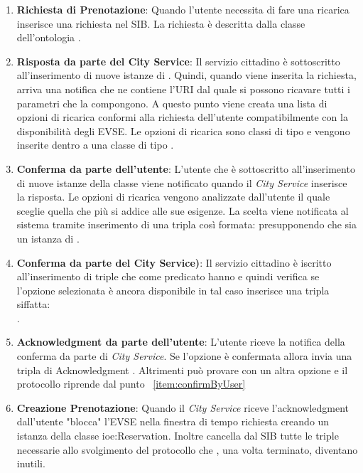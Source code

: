 \begin{enumerate}[label=\textbf{\arabic*}]
	\item \textbf{Richiesta di Prenotazione}: Quando l'utente necessita di fare una ricarica inserisce una richiesta nel SIB. La richiesta è descritta dalla classe dell'ontologia .
	\item \textbf{Risposta da parte del City Service}: Il servizio cittadino è sottoscritto all'inserimento di nuove istanze di . Quindi, quando viene inserita la richiesta, arriva una notifica che ne contiene l'URI dal quale si possono ricavare tutti i parametri che la compongono. A questo punto viene creata una lista di opzioni di ricarica conformi alla richiesta dell'utente compatibilmente con la disponibilità degli EVSE. Le opzioni di ricarica sono classi di tipo  e vengono inserite dentro a una classe di tipo .
	\item \label{item:confirmByUser} \textbf{Conferma da parte dell'utente}: L'utente che è sottoscritto all'inserimento di nuove istanze della classe   viene notificato quando il \emph{City Service} inserisce la risposta. Le opzioni di ricarica vengono analizzate dall'utente il quale sceglie quella che più si addice alle sue esigenze. La scelta viene notificata al sistema tramite inserimento di una tripla così formata:  presupponendo che  sia un istanza di .
	\item \textbf{Conferma da parte del City Service)}: Il servizio cittadino è iscritto all'inserimento di triple che come predicato hanno  e quindi verifica se l'opzione selezionata è ancora disponibile in tal caso inserisce una tripla siffatta:
	\\ . 
	\item \textbf{Acknowledgment da parte dell'utente}: L'utente riceve la notifica della conferma da parte di \emph{City Service}. Se l'opzione è confermata allora invia una tripla di Acknowledgment . Altrimenti può provare con un altra opzione e il protocollo riprende dal punto ~\ref{item:confirmByUser}
	\item \textbf{Creazione Prenotazione}: Quando il \emph{City Service} riceve l'acknowledgment dall'utente "blocca" l'EVSE nella finestra di tempo richiesta creando un istanza della classe {ioe:Reservation}. Inoltre cancella dal SIB tutte le triple necessarie allo svolgimento del protocollo che  , una volta terminato, diventano inutili.
\end{enumerate}

